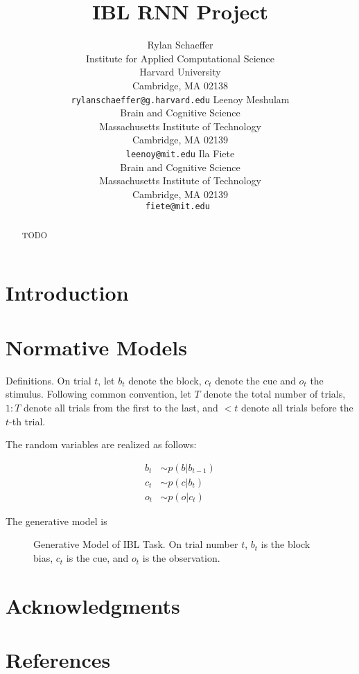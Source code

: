 \documentclass{article}
\title{IBL RNN Project}
\author{
    Rylan Schaeffer \\
  Institute for Applied Computational Science\\
  Harvard University\\
  Cambridge, MA 02138 \\
   \texttt{rylanschaeffer@g.harvard.edu}
   \AND
   Leenoy Meshulam \\
  Brain and Cognitive Science\\
  Massachusetts Institute of Technology\\
  Cambridge, MA 02139 \\
   \texttt{leenoy@mit.edu}
  \And 
  Ila Fiete\\
  Brain and Cognitive Science\\
  Massachusetts Institute of Technology\\
  Cambridge, MA 02139 \\
  \texttt{fiete@mit.edu } \\
}
\begin{document}
\maketitle

\begin{abstract}
TODO
\end{abstract}

\section{Introduction}

\section{Normative Models}

Definitions. On trial $t$, let $b_t$ denote the block, $c_t$ denote the cue and $o_t$ the stimulus. Following common convention, let $T$ denote the total number of trials, $1:T$ denote all trials from the first to the last, and $<t$ denote all trials before the $t$-th trial.

The random variables are realized as follows:

\begin{align*}
    b_t &\sim p(b|b_{t-1})\\
    c_t &\sim p(c|b_t)\\
    o_t &\sim p(o|c_t)
\end{align*}{}

The generative model is 

\begin{figure}
    \centering
    \caption{Generative Model of IBL Task. On trial number $t$, $b_t$ is the block bias, $c_t$ is the cue, and $o_t$ is the observation.}
    \label{fig:my_label}
\end{figure}{}

\begin{figure}
  \centering
\end{figure}



\section{Acknowledgments}

\section{References}
\printbibliography[heading=none]
\end{document}
